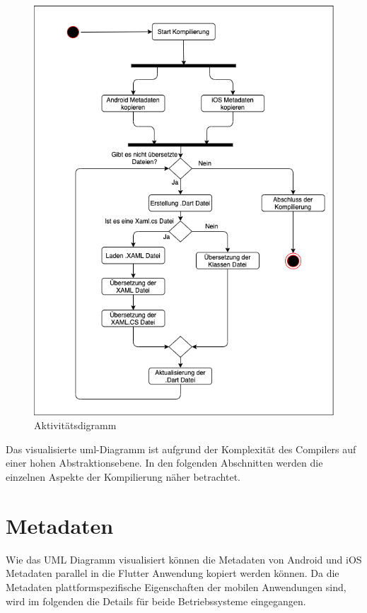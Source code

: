 \begin{figure}[!ht]
 \includegraphics[width=\textwidth,keepaspectratio]{Images/Implementation/Ablauf.png}
 \caption{Aktivitätsdigramm}
 \label{fig:umlablauf}
\end{figure}
Das visualisierte \ac{uml}-Diagramm ist aufgrund der Komplexität des Compilers auf einer hohen Abstraktionsebene.  In den folgenden Abschnitten werden die einzelnen Aspekte der Kompilierung näher betrachtet. 


\section{Metadaten}
Wie das UML Diagramm visualisiert können die Metadaten von Android und iOS Metadaten parallel in die Flutter Anwendung kopiert werden können.  Da die Metadaten plattformspezifische Eigenschaften der mobilen Anwendungen sind,  wird im  folgenden die Details für beide Betriebssysteme eingegangen. 

